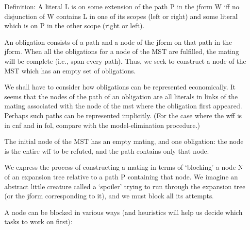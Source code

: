 Definition: A literal L is on some extension of the path P in the
jform W iff no disjunction of W contains L in one of its scopes (left
or right) and some literal which is on P in the other scope (right or
left).

	An obligation consists of a path and a node of the jform on
that path in the jform. When all the obligations for a node of the MST
are fulfilled, the mating will be complete (i.e., span every path).
Thus, we seek to construct a node of the MST which has an empty set of
obligations.


We shall have to consider how obligations can be represented
economically.  It seems that the nodes of the path of an obligation
are all literals in links of the mating associated with the node of
the mst where the obligation first appeared. Perhaps such paths can
be represented implicitly. (For the case where the wff is in cnf and
in fol, compare with the model-elimination procedure.)


	The initial node of the MST has an empty mating, and one
obligation: the node is the entire wff to be refuted, and the path
contains only that node.

	We express the process of constructing a mating in terms of
`blocking' a node N of an expansion tree relative to a path P
containing that node. We imagine an abstract little creature called a
`spoiler' trying to run through the expansion tree (or the jform
corresponding to it), and we must block all its attempts.

A node can be blocked in various ways (and
heuristics will help us decide which tasks to work on first):


